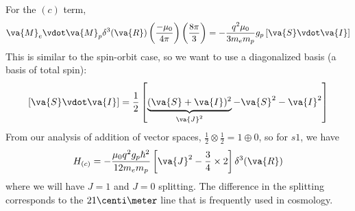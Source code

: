 \documentclass[a4paper,twoside,master.tex]{subfiles}
\begin{document}
For the $ (c) $ term,
\begin{equation}
    \va{M}_e \vdot \va{M}_p \delta^3(\va{R}) \left( \frac{- \mu_0}{4 \pi} \right) \left( \frac{8 \pi}{3} \right) = - \frac{q^2 \mu_0}{3 m_e m_p} g_p \left[ \va{S} \vdot \va{I} \right]
\end{equation}
This is similar to the spin-orbit case, so we want to use a diagonalized basis (a basis of total spin):
\begin{equation}
    \left[ \va{S} \vdot \va{I} \right] = \frac{1}{2} \left[ \underbrace{(\va{S} + \va{I})^2}_{\va{J}^2} - \va{S}^2 - \va{I}^2 \right]
\end{equation}
From our analysis of addition of vector spaces, $ \frac{1}{2} \otimes \frac{1}{2} = 1 \oplus 0 $, so for $ s1 $, we have
\begin{equation}
    H_{(c)} = - \frac{\mu_0 q^2 g_p \hbar^2}{12 m_e m_p} \left[ \va{J}^2 - \frac{3}{4} \times 2 \right] \delta^3(\va{R})
\end{equation}
where we will have $ J = 1 $ and $ J = 0 $ splitting. The difference in the splitting corresponds to the $ 21\centi\meter $ line that is frequently used in cosmology.
\end{document}
